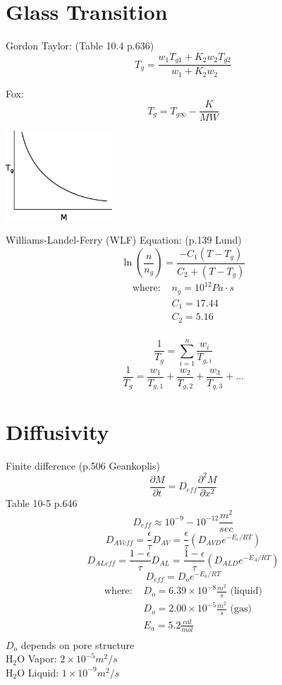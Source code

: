 \documentclass[11pt]{article}
\begin{document}
\section{Glass Transition}
Gordon Taylor: (Table 10.4 p.636)
\[ T_g = \frac{w_1 T_{g1} + K_2 w_2 T_{g2}}{w_1 + K_2 w_2} \]

Fox:
\[ T_g = T_{g\infty} - \frac{K}{MW} \]

\begin{center}
\includegraphics[width=0.3\textwidth]{pics/eps/glass_transition}
\end{center}

Williams-Landel-Ferry (WLF) Equation: (p.139 Lund)
\[ \ln\left(\frac{n}{n_g}\right) = \frac{-C_1 (T - T_g)}{C_2 + (T - T_g)} \]
\begin{align*}
\text{where: } &n_g = 10^{12} Pa \cdot s \\
& C_1 = 17.44\\
& C_2 = 5.16\\
\end{align*}

\[ \frac{1}{T_g} = \sum_{i=1}^n \frac{w_i}{T_{g,i}} \]
\[ \frac{1}{T_g} = \frac{w_1}{T_{g,1}} + \frac{w_2}{T_{g,2}} + \frac{w_3}{T_{g,3}} + ... \]

\section{Diffusivity}
Finite difference (p.506 Geankoplis)
\[ \frac{\partial M}{\partial t} = D_{eff} \frac{\partial^2 M}{\partial x^2} \]
Table 10-5 p.646
\[ D_{eff} \approx 10^{-9} - 10^{-12} \frac{m^2}{sec} \]
\[ D_{AVeff} = \frac{\epsilon}{\tau} D_{AV} = \frac{\epsilon}{\tau}(D_{AVD} e^{-E_c/RT}) \]
\[ D_{ALeff} = \frac{1-\epsilon}{\tau} D_{AL} = \frac{1-\epsilon}{\tau}(D_{ALD} e^{-E_A/RT}) \]
\[ D_{eff} = D_o e^{-E_a/RT} \]
\begin{align*}
\text{where: } & D_o = 6.39 \times 10^{-8} \frac{m^2}{s} \text{ (liquid)}\\
& D_o = 2.00 \times 10^{-5} \frac{m^2}{s} \text{ (gas)} \\
& E_a = 5.2 \frac{cal}{mol}\\
\end{align*}
$D_o$ depends on pore structure\\
H$_2$O Vapor: $2\times 10^{-5} m^2/s$\\
H$_2$O Liquid: $1\times 10^{-9} m^2/s$
\end{document}
